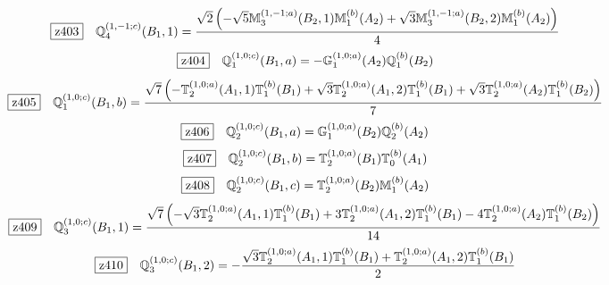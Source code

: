 \documentclass[fleqn,10pt,landscape]{jsarticle}
\begin{document}
\begin{dmath*}
\hspace*{3mm}\fbox{z403}\quad \mathbb{Q}_{4}^{(1,-1;c)}(B_{1},1)=\frac{\sqrt{2} \left(- \sqrt{5} \mathbb{M}_{3}^{(1,-1;a)}(B_{2},1) \mathbb{M}_{1}^{(b)}(A_{2}) + \sqrt{3} \mathbb{M}_{3}^{(1,-1;a)}(B_{2},2) \mathbb{M}_{1}^{(b)}(A_{2})\right)}{4}
\end{dmath*}
\begin{dmath*}
\hspace*{3mm}\fbox{z404}\quad \mathbb{Q}_{1}^{(1,0;c)}(B_{1},a)=- \mathbb{G}_{1}^{(1,0;a)}(A_{2}) \mathbb{Q}_{1}^{(b)}(B_{2})
\end{dmath*}
\begin{dmath*}
\hspace*{3mm}\fbox{z405}\quad \mathbb{Q}_{1}^{(1,0;c)}(B_{1},b)=\frac{\sqrt{7} \left(- \mathbb{T}_{2}^{(1,0;a)}(A_{1},1) \mathbb{T}_{1}^{(b)}(B_{1}) + \sqrt{3} \mathbb{T}_{2}^{(1,0;a)}(A_{1},2) \mathbb{T}_{1}^{(b)}(B_{1}) + \sqrt{3} \mathbb{T}_{2}^{(1,0;a)}(A_{2}) \mathbb{T}_{1}^{(b)}(B_{2})\right)}{7}
\end{dmath*}
\begin{dmath*}
\hspace*{3mm}\fbox{z406}\quad \mathbb{Q}_{2}^{(1,0;c)}(B_{1},a)=\mathbb{G}_{1}^{(1,0;a)}(B_{2}) \mathbb{Q}_{2}^{(b)}(A_{2})
\end{dmath*}
\begin{dmath*}
\hspace*{3mm}\fbox{z407}\quad \mathbb{Q}_{2}^{(1,0;c)}(B_{1},b)=\mathbb{T}_{2}^{(1,0;a)}(B_{1}) \mathbb{T}_{0}^{(b)}(A_{1})
\end{dmath*}
\begin{dmath*}
\hspace*{3mm}\fbox{z408}\quad \mathbb{Q}_{2}^{(1,0;c)}(B_{1},c)=\mathbb{T}_{2}^{(1,0;a)}(B_{2}) \mathbb{M}_{1}^{(b)}(A_{2})
\end{dmath*}
\begin{dmath*}
\hspace*{3mm}\fbox{z409}\quad \mathbb{Q}_{3}^{(1,0;c)}(B_{1},1)=\frac{\sqrt{7} \left(- \sqrt{3} \mathbb{T}_{2}^{(1,0;a)}(A_{1},1) \mathbb{T}_{1}^{(b)}(B_{1}) + 3 \mathbb{T}_{2}^{(1,0;a)}(A_{1},2) \mathbb{T}_{1}^{(b)}(B_{1}) - 4 \mathbb{T}_{2}^{(1,0;a)}(A_{2}) \mathbb{T}_{1}^{(b)}(B_{2})\right)}{14}
\end{dmath*}
\begin{dmath*}
\hspace*{3mm}\fbox{z410}\quad \mathbb{Q}_{3}^{(1,0;c)}(B_{1},2)=- \frac{\sqrt{3} \mathbb{T}_{2}^{(1,0;a)}(A_{1},1) \mathbb{T}_{1}^{(b)}(B_{1}) + \mathbb{T}_{2}^{(1,0;a)}(A_{1},2) \mathbb{T}_{1}^{(b)}(B_{1})}{2}
\end{dmath*}
\end{document}
